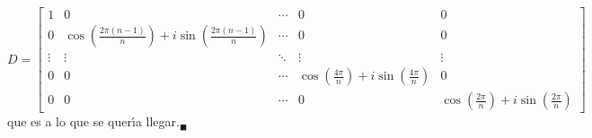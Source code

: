 \begin{solucion}
 \begin{equation*}
  D = 
  \begin{bmatrix}
   1 & 0 & \cdots & 0 & 0 \\
   0 & \cos\left( \frac{2\pi(n-1)}{n} \right) + i\sin\left( \frac{2\pi(n-1)}{n} \right) & \cdots & 0 & 0 \\
   \vdots & \vdots & \ddots & \vdots & \vdots \\
   0 & 0 & \cdots & \cos\left( \frac{4\pi}{n} \right) + i\sin\left( \frac{4\pi}{n} \right) & 0 \\
   0 & 0 & \cdots & 0 & \cos\left( \frac{2\pi}{n} \right) + i\sin\left( \frac{2\pi}{n} \right)
  \end{bmatrix}
 \end{equation*}
 que es a lo que se quer\'{\i}a llegar.${}_{\blacksquare}$
\end{solucion}
